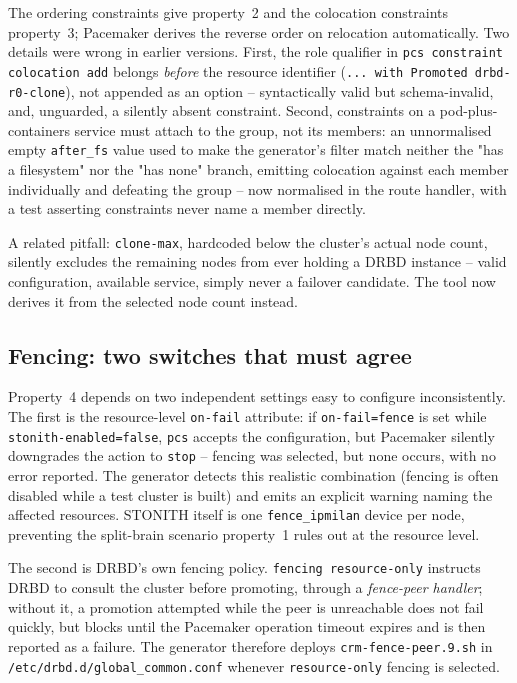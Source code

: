 \documentclass{webofc}
\begin{document}
The ordering constraints give property~2 and the colocation constraints
property~3; Pacemaker derives the reverse order on relocation
automatically. Two details were wrong in earlier versions. First, the
role qualifier in \texttt{pcs constraint colocation add} belongs
\emph{before} the resource identifier (\texttt{... with Promoted
drbd-r0-clone}), not appended as an option -- syntactically valid but
schema-invalid, and, unguarded, a silently absent constraint. Second,
constraints on a pod-plus-containers
service must attach to the group, not its members: an unnormalised empty
\texttt{after\_fs} value used to make the generator's filter match
neither the "has a filesystem" nor the "has none" branch, emitting
colocation against each member individually and defeating the group --
now normalised in the route handler, with a test asserting constraints
never name a member directly.

A related pitfall: \texttt{clone-max}, hardcoded below the cluster's
actual node count, silently excludes the remaining nodes from ever
holding a DRBD instance -- valid configuration, available service,
simply never a failover candidate. The tool now derives it from the
selected node count instead.

\subsection{Fencing: two switches that must agree}

Property~4 depends on two independent settings easy to configure
inconsistently. The first is the resource-level \texttt{on-fail}
attribute: if \texttt{on-fail=fence} is set while
\texttt{stonith-enabled=false}, \texttt{pcs} accepts the configuration,
but Pacemaker silently downgrades the action to \texttt{stop} -- fencing
was selected, but none occurs, with no error reported. The generator
detects this realistic combination (fencing is often disabled while a
test cluster is built) and emits an explicit warning naming the affected
resources. STONITH itself is one \texttt{fence\_ipmilan} device per node,
preventing the split-brain scenario property~1 rules out at the resource
level.

The second is DRBD's own fencing policy. \texttt{fencing resource-only}
instructs DRBD to consult the cluster before promoting, through a
\emph{fence-peer handler}; without it, a promotion attempted while the
peer is unreachable does not fail quickly, but blocks until the
Pacemaker operation timeout expires and is then reported as a failure.
The generator therefore deploys \texttt{crm-fence-peer.9.sh} in
\texttt{/etc/drbd.d/global\_common.conf} whenever \texttt{resource-only}
fencing is selected.
\end{document}

